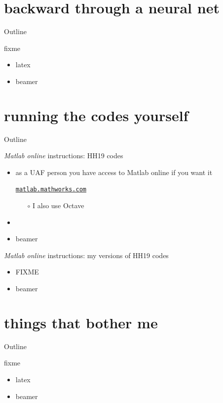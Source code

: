 \documentclass[xcolor={svgnames},
               hyperref={colorlinks,citecolor=DeepPink4,linkcolor=FireBrick,urlcolor=Maroon}]
               {beamer}
\begin{document}
\section{backward through a neural net}

\begin{frame}{Outline}
\end{frame}

\begin{frame}{fixme}

\begin{itemize}
\item latex
\item beamer
\end{itemize}
\end{frame}


\section{running the codes yourself}

\begin{frame}{Outline}
\end{frame}

\begin{frame}{\emph{Matlab online} instructions: HH19 codes}

\begin{itemize}
\item as a UAF person you have access to Matlab online if you want it

\begin{center}
\href{https://matlab.mathworks.com/}{\texttt{matlab.mathworks.com}}
\end{center}

    \begin{itemize}
    \item[$\circ$] I also use Octave
    \end{itemize}
\item 
\item beamer
\end{itemize}
\end{frame}


\begin{frame}{\emph{Matlab online} instructions: my versions of HH19 codes}

\begin{itemize}
\item FIXME
\item beamer
\end{itemize}
\end{frame}


\section{things that bother me}

\begin{frame}{Outline}
\end{frame}

\begin{frame}{fixme}

\begin{itemize}
\item latex
\item beamer
\end{itemize}
\end{frame}
\end{document}
